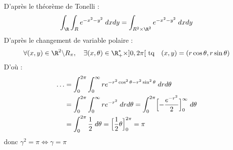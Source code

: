 \begin{example}[Gaussienne]
    \vspace{0.5cm}
    D'après le théorème de Tonelli :
    \[ \int_\R \int_R e^{-x^2-y^2} \; dxdy  = \int_{R^2 \times \R^2} e^{-x^2-y^2} \; dxdy  \] 
    D'après le changement de variable polaire :
    \[ \forall (x,y) \in \R^2 \backslash R_\pi, \quad \exists (x,\theta) \in \R_+^* \times ]0,2\pi[ \text{ tq} \quad (x,y) = (r \cos \theta, r \sin \theta) \]
    D'où : 
    \begin{align*}
        \dots &= \int_{0}^{2\pi} \int_{0}^{\infty} r e^{-r^2 \cos^2 \theta - r^2 \sin^2 \theta} \; dr d\theta \\
            &= \int_{0}^{2\pi} \int_{0}^{\infty} r e^{-r^2} \; dr d \theta = \int_{0}^{2\pi} \Bigl[ - \frac{e^{-r^2}}{2}\Bigr]_0^\infty \; d \theta \\
            &= \int_{0}^{2\pi} \frac{1}{2} \; d \theta = \Bigl[ \frac{1}{2} \theta\Bigr]_0^{2\pi} = \pi 
    \end{align*}
    donc $ \gamma^2 = \pi \Longleftrightarrow \gamma = \pi $
\end{example}

